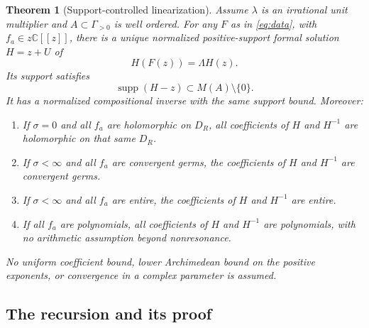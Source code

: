 \documentclass[11pt,a4paper]{article}
\numberwithin{equation}{section}
\newtheorem{theorem}{Theorem}[section]
\theoremstyle{definition}
\theoremstyle{remark}
\newcommand{\C}{\mathbb C}
\newcommand{\supp}{\operatorname{supp}}
\begin{document}
\begin{theorem}[Support-controlled linearization]\label{thm:lifting}
Assume $\lambda$ is an irrational unit multiplier and $A\subset\Gamma_{>0}$
is well ordered. For any $F$ as in \eqref{eq:data}, with
$f_a\in z\C[[z]]$, there is a unique normalized positive-support formal
solution $H=z+U$ of
\[
 H(F(z))=\Lambda H(z).
\]
Its support satisfies
\begin{equation}\label{eq:supportcertificate}
 \supp(H-z)\subset M(A)\setminus\{0\}.
\end{equation}
It has a normalized compositional inverse with the same support bound.
Moreover:
\begin{enumerate}[label=(\roman*),leftmargin=2em]
\item If $\sigma=0$ and all $f_a$ are holomorphic on $D_R$, all coefficients
of $H$ and $H^{-1}$ are holomorphic on that same $D_R$.
\item If $\sigma<\infty$ and all $f_a$ are convergent germs, the coefficients
of $H$ and $H^{-1}$ are convergent germs.
\item If $\sigma<\infty$ and all $f_a$ are entire, the coefficients of
$H$ and $H^{-1}$ are entire.
\item If all $f_a$ are polynomials, all coefficients of $H$ and $H^{-1}$
are polynomials, with no arithmetic assumption beyond nonresonance.
\end{enumerate}
No uniform coefficient bound, lower Archimedean bound on the positive
exponents, or convergence in a complex parameter is assumed.
\end{theorem}

\subsection{The recursion and its proof}
\end{document}
